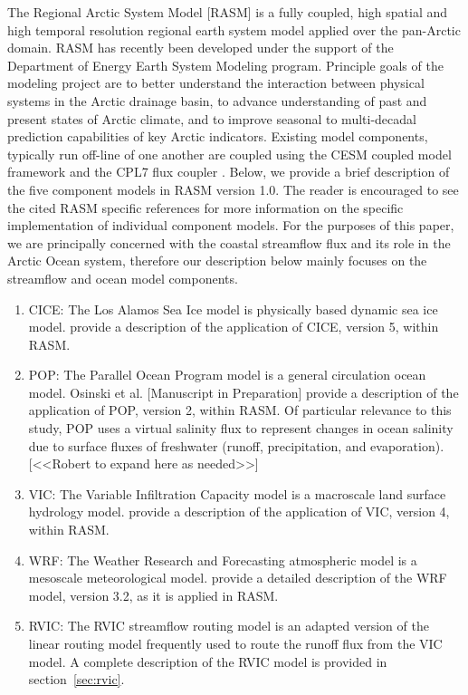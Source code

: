\documentclass[jgrga, draft]{agutex}
\begin{document}
\begin{article}
The Regional Arctic System Model [RASM] is a fully coupled, high spatial and high temporal resolution regional earth system model applied over the pan-Arctic domain.
RASM has recently been developed under the support of the Department of Energy Earth System Modeling program.
Principle goals of the modeling project are to better understand the interaction between physical systems in the Arctic drainage basin, to advance understanding of past and present states of Arctic climate, and to improve seasonal to multi-decadal prediction capabilities of key Arctic indicators.
Existing model components, typically run off-line of one another are coupled using the CESM coupled model framework and the CPL7 flux coupler \citep{Craig_2011}.
Below, we provide a brief description of the five component models in RASM version 1.0.
The reader is encouraged to see the cited RASM specific references for more information on the specific implementation of individual component models.
For the purposes of this paper, we are principally concerned with the coastal streamflow flux and its role in the Arctic Ocean system, therefore our description below mainly focuses on the streamflow and ocean model components.

\begin{enumerate}
\item CICE: The Los Alamos Sea Ice model \citep{Hunke_2010} is physically based dynamic sea ice model.
\citet{Roberts_2015b} provide a description of the application of CICE, version 5, within RASM.
\item POP: The Parallel Ocean Program model \citep{Smith_2010} is a general circulation ocean model.
Osinski et al. [Manuscript in Preparation] provide a description of the application of POP, version 2, within RASM.
Of particular relevance to this study, POP uses a virtual salinity flux to represent changes in ocean salinity due to surface fluxes of freshwater (runoff, precipitation, and evaporation). [<<Robert to expand here as needed>>]
\item VIC: The Variable Infiltration Capacity model \citep{Liang_1996} is a macroscale land surface hydrology model.
\citet{Hamman_2015} provide a description of the application of VIC, version 4, within RASM.
\item WRF: The Weather Research and Forecasting atmospheric model \citep{Skamarock_2007} is a mesoscale meteorological model.
\citet{Cassano_2015} provide a detailed description of the WRF model, version 3.2, as it is applied in RASM.
\item RVIC: The RVIC streamflow routing model is an adapted version of the \citet{Lohmann_1996} linear routing model frequently used to route the runoff flux from the VIC model.
A complete description of the RVIC model is provided in section~\ref{sec:rvic}.
\end{enumerate}


\end{article}
\end{document}
